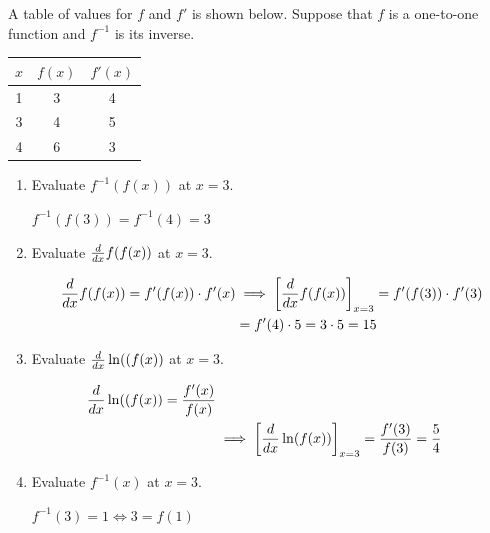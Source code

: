 \documentclass[nooutcomes,handout]{ximera}
\begin{document}
\begin{problem}
  A table of values for $f$ and $f'$ is shown below.
  Suppose that $f$ is a one-to-one function and $f^{-1}$ is its inverse.
  \begin{center}
    \begin{tabular}{ccc}
\hline
      $x$ & $f(x)$ & $f'(x)$\\
\hline \hline
      1 & 3 & 4\\

      3 & 4 & 5\\

      4 & 6 & 3\\
\hline
    \end{tabular}
  \end{center}

  \begin{enumerate}
    \item Evaluate $f^{-1}(f(x))$ at $x = 3$.
      \begin{freeResponse}
         $ f^{-1}(f(3)) = f^{-1}(4) = 3$
      \end{freeResponse}


    \item Evaluate $\frac{d}{dx} f(f(x))$ at $x = 3$.
      \begin{freeResponse}

        \begin{align*}
          \frac{d}{dx} f(f(x)) = f'(f(x)) \cdot f'(x) &\implies \bigg[ \frac{d}{dx} f(f(x)) \bigg]_{x = 3} = f'(f(3)) \cdot f'(3)\\
          &= f'(4) \cdot 5 = 3 \cdot 5 = 15
        \end{align*}
      \end{freeResponse}


    \item Evaluate $\frac{d}{dx}\ln((f(x))$ at $x = 3$.
      \begin{freeResponse}

        \begin{align*}
          \frac{d}{dx}\ln((f(x)) = \frac{f'(x)}{f(x)} \\
          &\implies \bigg[ \frac{d}{dx} \ln(f(x)) \bigg]_{x = 3} = \frac{f'(3)}{f(3)} = \frac{5}{4}
        \end{align*}
      \end{freeResponse}


    \item Evaluate $f^{-1}(x)$ at $x = 3$.
      \begin{freeResponse}
	$ f^{-1}(3) = 1 \iff 3 = f(1)$
      \end{freeResponse}



\end{enumerate}
\end{problem}
\end{document}

